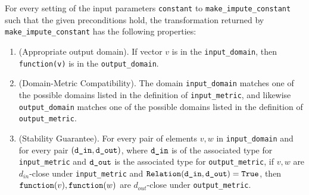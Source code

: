 \begin{theorem}
For every setting of the input parameters \texttt{constant} to \texttt{make\_impute\_constant} such that the given preconditions hold, the transformation returned by \texttt{make\_impute\_constant} has the following properties:
\begin{enumerate}
    \item \textup{(Appropriate output domain).} If vector $v$ is in the \texttt{input\_domain}, then \texttt{function(v)} is in the \texttt{output\_domain}.
    \item \textup{(Domain-Metric Compatibility).} The domain \texttt{input\_domain} matches one of the possible domains listed in the definition of \texttt{input\_metric}, and likewise \texttt{output\_domain} matches one of the possible domains listed in the definition of \texttt{output\_metric}.
    \item \textup{(Stability Guarantee).} For every pair of elements $v, w$ in \texttt{input\_domain} and for every pair $(\texttt{d\_in}, \texttt{d\_out})$, where $\texttt{d\_in}$ is of the associated type for \texttt{input\_metric} and $\texttt{d\_out}$ is the associated type for \texttt{output\_metric}, if $v,w$ are $d_{in}$-close under \texttt{input\_metric} and $\texttt{Relation}(\texttt{d\_in}, \texttt{d\_out}) = \texttt{True}$, then $\texttt{function}(v), \texttt{function}(w)$ are $d_{out}$-close under \texttt{output\_metric}.
\end{enumerate}
\end{theorem}
